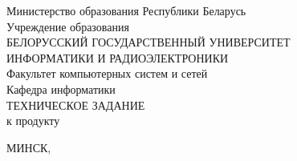\begin{center}
    \normalsize
    Министерство образования Республики Беларусь\\
    \bigskip
    Учреждение образования\\
    \bigskip
    БЕЛОРУССКИЙ ГОСУДАРСТВЕННЫЙ УНИВЕРСИТЕТ\\
    \bigskip
    ИНФОРМАТИКИ И РАДИОЭЛЕКТРОНИКИ\\
    \bigskip
    Факультет компьютерных систем и сетей\\
    \bigskip
    Кафедра информатики\\
    \bigskip
    \bigskip
    \Large ТЕХНИЧЕСКОЕ ЗАДАНИЕ\\
    к продукту\\
    \bigskip
    \LARGE \thetitle
    \bigskip
\end{center}
\normalsize
\vspace*{\fill}
\begin{center}
    МИНСК, \year
\end{center}
\newpage

